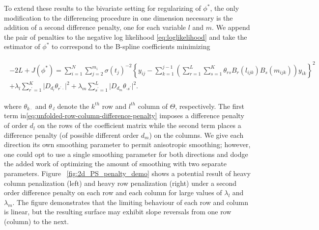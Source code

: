 \documentclass[12pt]{article}
\newcommand{\ms}{\scriptscriptstyle}
\theoremstyle{definition}
\begin{document}
To extend these results to the bivariate setting for regularizing of $\phi^*$, the only modification to the differencing procedure in one dimension necessary is the addition of a second difference penalty, one for each variable $l$ and $m$. We append the pair of penalties to the negative log likelihood \ref{eq:loglikelihood} and take the estimator of $\phi^*$ to correspond to the B-spline coefficients minimizing

\begin{align} 
\begin{split}\label{eq:unfolded-difference-penalty-log-likelihood}
-2L + J\left(\phi^*\right) = \sum_{i=1}^N \sum_{j=2}^{m_i} \sigma\left({t_j}\right)^{-2} \left\{y_{ij} - \sum_{k=1}^{j-1} \left( \sum_{r=1}^L \sum_{s=1}^K \theta_{rs} B_r\left(l_{ijk}\right)B_s\left(m_{ijk}\right)\right)y_{ik} \right\}^2 \\ 
+ \lambda_l \sum_{r^\prime=1}^K \vert D_{d_{\ms l}} \theta_{r^\prime \cdot} \vert^2 + \lambda_m \sum_{s^\prime=1}^L \vert D_{d_{\ms m}} \theta_{\cdot s^\prime} \vert^2.
\end{split}
\end{align}



\noindent
where $\theta_{k \cdot}$ and $\theta_{\cdot l}$ denote the $k^{th}$ row and $l^{th}$ column of $\Theta$, respectively. The first term in\ref{eq:unfolded-row-column-difference-penalty} imposes a difference penalty of order $d_{\ms l}$ on the rows of the coefficient matrix while the second term places a difference penalty (of possible different order $d_{\ms m}$) on the columns. We give each direction its own smoothing parameter to permit anisotropic smoothing; however, one could opt to use a single smoothing parameter for both directions and dodge the added work of optimizing the amount of smoothing with two separate parameters. Figure ~\ref{fig:2d_PS_penalty_demo} shows a potential result of heavy column penalization (left) and heavy row penalization (right) under a second order difference penalty on each row and each column for large values of $\lambda_l$ and $\lambda_m$. The figure demonstrates that the limiting behaviour of each row and column is linear, but the resulting surface may exhibit slope reversals from one row (column) to the next. 
\end{document}

